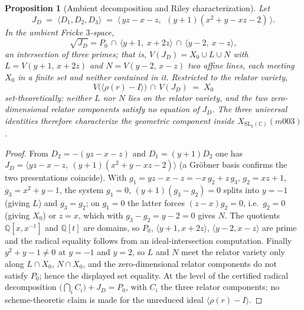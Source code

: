 \documentclass[11pt,a4paper]{article}
\newtheorem{proposition}[theorem]{Proposition}
\theoremstyle{definition}
\theoremstyle{remark}
\newcommand{\SLtwo}{\mathrm{SL}_2(\mathbb{C})}
\newcommand{\Q}{\mathbb{Q}}
\begin{document}
\begin{proposition}[Ambient decomposition and Riley characterization]
\label{prop:jd}
Let
\begin{equation*}
J_D \;=\; \langle D_1, D_2, D_3\rangle
\;=\; \langle\, yz - x - z,\ \ (y+1)(x^2 + y - xz - 2)\,\rangle .
\end{equation*}
In the ambient Fricke $3$-space,
\begin{equation}
\sqrt{J_D}
= P_0 \,\cap\, \langle y+1,\ x+2z\rangle
      \,\cap\, \langle y-2,\ x-z\rangle ,
\end{equation}
an intersection of three primes; that is, $V(J_D) = X_0 \cup L \cup N$
with $L = V(y+1,\,x+2z)$ and $N = V(y-2,\,x-z)$ two affine lines, each
meeting $X_0$ in a finite set and neither contained in it. Restricted
to the relator variety,
\begin{equation}
V\bigl(\langle \rho(r) - I\rangle\bigr) \,\cap\, V(J_D) \;=\; X_0
\end{equation}
set-theoretically: neither $L$ nor $N$ lies on the relator variety,
and the two zero-dimensional relator components satisfy no equation of
$J_D$. The three universal identities therefore characterize the
geometric component inside $X_{\SLtwo}(m003)$.
\end{proposition}

\begin{proof}
From $D_2 = -(yz-x-z)$ and $D_1 = (y+1)D_2$ one has
$J_D = \langle yz-x-z,\ (y+1)(x^2+y-xz-2)\rangle$ (a Gr\"obner basis
confirms the two presentations coincide). With
$g_1 = yz-x-z = -x\,g_2 + z\,g_3$, $g_2 = xz+1$, $g_3 = x^2+y-1$, the
system $g_1 = 0$, $(y+1)(g_3-g_2) = 0$ splits into $y=-1$ (giving $L$)
and $g_3 = g_2$; on $g_1=0$ the latter forces $(z-x)g_2 = 0$, i.e.\
$g_2 = 0$ (giving $X_0$) or $z = x$, which with $g_3-g_2 = y-2 = 0$
gives $N$. The quotients $\Q[x,x^{-1}]$ and $\Q[t]$ are domains, so
$P_0$, $\langle y+1,x+2z\rangle$, $\langle y-2,x-z\rangle$ are prime
and the radical equality follows from an ideal-intersection
computation. Finally $y^2+y-1 \neq 0$ at $y = -1$ and $y = 2$, so $L$
and $N$ meet the relator variety only along $L \cap X_0$,
$N \cap X_0$, and the zero-dimensional relator components do not
satisfy $P_0$; hence the displayed set equality. At the level of the
certified radical decomposition
$\bigl(\bigcap_i C_i\bigr) + J_D = P_0$, with $C_i$ the three relator
components; no scheme-theoretic claim is made for the unreduced ideal
$\langle \rho(r) - I\rangle$.
\end{proof}
\end{document}
